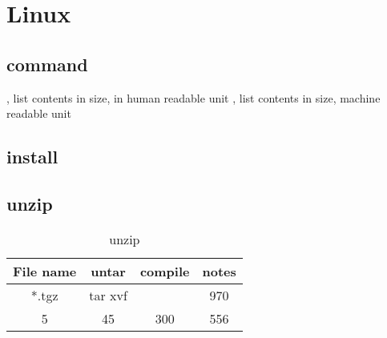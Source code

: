 \chapter{Linux}

\section{command}

,  list contents in size, in human readable unit
, list contents in size, machine readable unit

\section{install}


\section{unzip}

\begin{table}[ht]
\caption{unzip} %
\centering %
\begin{tabular}{c c c c}
\hline\hline %
File name & untar & compile & notes \\ [0.5ex]
\hline %
*.tgz & tar xvf  &  & 970 \\
5 & 45 & 300 & 556 \\ [1ex] %
\hline %
\end{tabular}
\label{table:nonlin} %
\end{table}



